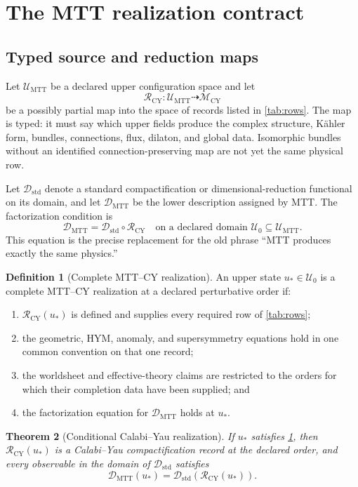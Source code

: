 \documentclass[11pt]{article}
\newtheorem{theorem}{Theorem}[section]
\theoremstyle{definition}
\newtheorem{definition}[theorem]{Definition}
\theoremstyle{remark}
\newcommand{\cD}{\mathcal D}
\newcommand{\cM}{\mathcal M}
\newcommand{\cR}{\mathcal R}
\newcommand{\cU}{\mathcal U}
\begin{document}
\section{The MTT realization contract}
\label{sec:contract}

\subsection{Typed source and reduction maps}

Let \(\cU_{\mathrm{MTT}}\) be a declared upper configuration space and let
\[
\cR_{\mathrm{CY}}:\cU_{\mathrm{MTT}}\dashrightarrow
\cM_{\mathrm{CY}}
\]
be a possibly partial map into the space of records listed in
\cref{tab:rows}.  The map is typed: it must say which upper fields produce
the complex structure, K\"ahler form, bundles, connections, flux, dilaton,
and global data.  Isomorphic bundles without an identified
connection-preserving map are not yet the same physical row.

Let \(\cD_{\mathrm{std}}\) denote a standard compactification or
dimensional-reduction functional on its domain, and let
\(\cD_{\mathrm{MTT}}\) be the lower description assigned by MTT.  The
factorization condition is
\[
\cD_{\mathrm{MTT}}
=\cD_{\mathrm{std}}\circ\cR_{\mathrm{CY}}
\quad\text{on a declared domain } \cU_0\subseteq\cU_{\mathrm{MTT}}.
\]
This equation is the precise replacement for the old phrase ``MTT produces
exactly the same physics.''

\begin{definition}[Complete MTT--CY realization]
\label{def:complete-realization}
An upper state \(u_\ast\in\cU_0\) is a complete MTT--CY realization at a
declared perturbative order if:
\begin{enumerate}[leftmargin=1.7em]
\item \(\cR_{\mathrm{CY}}(u_\ast)\) is defined and supplies every required
      row of \cref{tab:rows};
\item the geometric, HYM, anomaly, and supersymmetry equations hold in one
      common convention on that one record;
\item the worldsheet and effective-theory claims are restricted to the
      orders for which their completion data have been supplied; and
\item the factorization equation for \(\cD_{\mathrm{MTT}}\) holds at
      \(u_\ast\).
\end{enumerate}
\end{definition}

\begin{theorem}[Conditional Calabi--Yau realization]
\label{thm:conditional-realization}
If \(u_\ast\) satisfies \cref{def:complete-realization}, then
\(\cR_{\mathrm{CY}}(u_\ast)\) is a Calabi--Yau compactification record at the
declared order, and every observable in the domain of
\(\cD_{\mathrm{std}}\) satisfies
\[
\cD_{\mathrm{MTT}}(u_\ast)
=\cD_{\mathrm{std}}\!\left(\cR_{\mathrm{CY}}(u_\ast)\right).
\]
\end{theorem}
\end{document}
